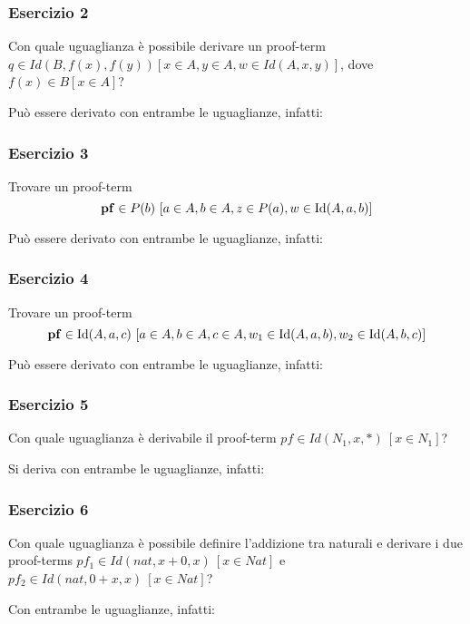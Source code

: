 \subsubsection{Esercizio 2}
\begin{thm}
	Con quale uguaglianza è possibile derivare un proof-term $q\in Id(B, f(x), f(y)) [x\in A, y\in A, w\in Id(A, x, y)]$, dove $f(x)\in B[x\in A]$?
\end{thm}
Può essere derivato con entrambe le uguaglianze, infatti:


\subsubsection{Esercizio 3}
\begin{thm} Trovare un proof-term
	\[ \mathbf{pf}\in P(b)\ [a\in A, b\in A, z\in P(a), w\in \mathrm{Id}(A, a, b)]\]
\end{thm}
Può essere derivato con entrambe le uguaglianze, infatti:



\subsubsection{Esercizio 4}\label{es4Sez5}
\begin{thm}
	Trovare un proof-term
	\[ \mathbf{pf} \in \mathrm{Id}(A, a, c)\ [a\in A, b\in A, c\in A, w_1 \in \mathrm{Id}(A, a, b), w_2 \in \mathrm{Id}(A, b, c) ] \]
\end{thm}

Può essere derivato con entrambe le uguaglianze, infatti:



\subsubsection{Esercizio 5}
\begin{thm}
	Con quale uguaglianza è derivabile il proof-term $pf\in Id(N_1, x, \ast)~[x\in N_1]$?
\end{thm}
Si deriva con entrambe le uguaglianze, infatti:


\subsubsection{Esercizio 6}
\begin{thm}
	Con quale uguaglianza è possibile definire l'addizione tra naturali e derivare i due proof-terms $pf_1\in Id(nat, x+0,x)~[x\in Nat]$ e $pf_2\in Id(nat, 0+x,x)~[x\in Nat]$?
\end{thm}
Con entrambe le uguaglianze, infatti:


